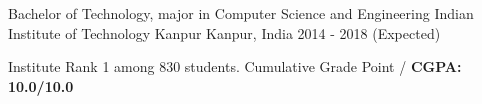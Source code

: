 


\begin{cventries}


\cventry
{Bachelor of Technology, major in Computer Science and Engineering} %
{Indian Institute of Technology Kanpur} %
{Kanpur, India} %
{2014 - 2018 (Expected)} %
{%
\begin{cvitems}
\item {Institute Rank 1 among 830 students. Cumulative Grade Point /
    \textbf{CGPA: 10.0/10.0}}
\end{cvitems}
}

\end{cventries}

